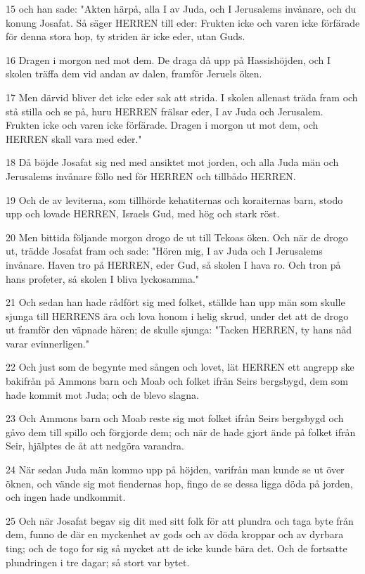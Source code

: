 \par 15 och han sade: "Akten härpå, alla I av Juda, och I Jerusalems invånare, och du konung Josafat. Så säger HERREN till eder: Frukten icke och varen icke förfärade för denna stora hop, ty striden är icke eder, utan Guds.
\par 16 Dragen i morgon ned mot dem. De draga då upp på Hassishöjden, och I skolen träffa dem vid andan av dalen, framför Jeruels öken.
\par 17 Men därvid bliver det icke eder sak att strida. I skolen allenast träda fram och stå stilla och se på, huru HERREN frälsar eder, I av Juda och Jerusalem. Frukten icke och varen icke förfärade. Dragen i morgon ut mot dem, och HERREN skall vara med eder."
\par 18 Då böjde Josafat sig ned med ansiktet mot jorden, och alla Juda män och Jerusalems invånare föllo ned för HERREN och tillbådo HERREN.
\par 19 Och de av leviterna, som tillhörde kehatiternas och koraiternas barn, stodo upp och lovade HERREN, Israels Gud, med hög och stark röst.
\par 20 Men bittida följande morgon drogo de ut till Tekoas öken. Och när de drogo ut, trädde Josafat fram och sade: "Hören mig, I av Juda och I Jerusalems invånare. Haven tro på HERREN, eder Gud, så skolen I hava ro. Och tron på hans profeter, så skolen I bliva lyckosamma."
\par 21 Och sedan han hade rådfört sig med folket, ställde han upp män som skulle sjunga till HERRENS ära och lova honom i helig skrud, under det att de drogo ut framför den väpnade hären; de skulle sjunga: "Tacken HERREN, ty hans nåd varar evinnerligen."
\par 22 Och just som de begynte med sången och lovet, lät HERREN ett angrepp ske bakifrån på Ammons barn och Moab och folket ifrån Seirs bergsbygd, dem som hade kommit mot Juda; och de blevo slagna.
\par 23 Och Ammons barn och Moab reste sig mot folket ifrån Seirs bergsbygd och gåvo dem till spillo och förgjorde dem; och när de hade gjort ände på folket ifrån Seir, hjälptes de åt att nedgöra varandra.
\par 24 När sedan Juda män kommo upp på höjden, varifrån man kunde se ut över öknen, och vände sig mot fiendernas hop, fingo de se dessa ligga döda på jorden, och ingen hade undkommit.
\par 25 Och när Josafat begav sig dit med sitt folk för att plundra och taga byte från dem, funno de där en myckenhet av gods och av döda kroppar och av dyrbara ting; och de togo for sig så mycket att de icke kunde bära det. Och de fortsatte plundringen i tre dagar; så stort var bytet.
